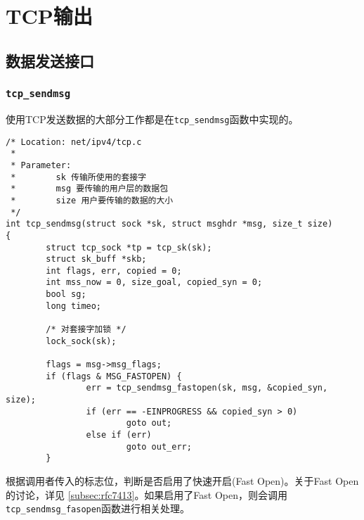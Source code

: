 \chapter{TCP输出}
\label{chapter:tcp_output}

\minitoc

\section{数据发送接口}
\subsection{\texttt{tcp_sendmsg}}
使用TCP发送数据的大部分工作都是在\texttt{tcp_sendmsg}函数中实现的。

\begin{verbatim}
/* Location: net/ipv4/tcp.c
 *
 * Parameter:
 *        sk 传输所使用的套接字
 *        msg 要传输的用户层的数据包
 *        size 用户要传输的数据的大小
 */
int tcp_sendmsg(struct sock *sk, struct msghdr *msg, size_t size)
{
        struct tcp_sock *tp = tcp_sk(sk);
        struct sk_buff *skb;
        int flags, err, copied = 0;
        int mss_now = 0, size_goal, copied_syn = 0;
        bool sg;
        long timeo;

        /* 对套接字加锁 */
        lock_sock(sk);

        flags = msg->msg_flags;
        if (flags & MSG_FASTOPEN) {
                err = tcp_sendmsg_fastopen(sk, msg, &copied_syn, size);
                if (err == -EINPROGRESS && copied_syn > 0)
                        goto out;
                else if (err)
                        goto out_err;
        }
\end{verbatim}
根据调用者传入的标志位，判断是否启用了快速开启(Fast Open)。关于Fast Open的讨论，详见
\ref{subsec:rfc7413}。如果启用了Fast Open，则会调用
\texttt{tcp_sendmsg_fasopen}函数进行相关处理。

